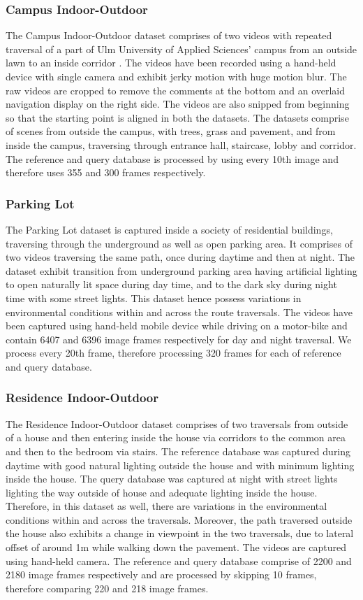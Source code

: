 \documentclass[letterpaper, 10 pt, conference]{ieeeconf}  %
\begin{document}
\subsubsection{Campus Indoor-Outdoor}
The Campus Indoor-Outdoor dataset comprises of two videos with repeated traversal of a part of Ulm University of Applied Sciences' campus from an outside lawn to an inside corridor \cite{indoorOutdoor1,indoorOutdoor2}. The videos have been recorded using a hand-held device with single camera and exhibit jerky motion with huge motion blur. The raw videos are cropped to remove the comments at the bottom and an overlaid navigation display on the right side. The videos are also snipped from beginning so that the starting point is aligned in both the datasets. The datasets comprise of scenes from outside the campus, with trees, grass and pavement, and from inside the campus, traversing through entrance hall, staircase, lobby and corridor. The reference and query database is processed by using every 10th image and therefore uses 355 and 300 frames respectively.

\subsubsection{Parking Lot}
The Parking Lot dataset is captured inside a society of residential buildings, traversing through the underground as well as open parking area. It comprises of two videos traversing the same path, once during daytime and then at night. The dataset exhibit transition from underground parking area having artificial lighting to open naturally lit space during day time, and to the dark sky during night time with some street lights. This dataset hence possess variations in environmental conditions within and across the route traversals. The videos have been captured using hand-held mobile device while driving on a motor-bike and contain 6407 and 6396 image frames respectively for day and night traversal. We process every 20th frame, therefore processing 320 frames for each of reference and query database.

\subsubsection{Residence Indoor-Outdoor}
The Residence Indoor-Outdoor dataset comprises of two traversals from outside of a house and then entering inside the house via corridors to the common area and then to the bedroom via stairs. The reference database was captured during daytime with good natural lighting outside the house and with minimum lighting inside the house. The query database was captured at night with street lights lighting the way outside of house and adequate lighting inside the house. Therefore, in this dataset as well, there are variations in the environmental conditions within and across the traversals. Moreover, the path traversed outside the house also exhibits a change in viewpoint in the two traversals, due to lateral offset of around 1m while walking down the pavement. The videos are captured using hand-held camera. The reference and query database comprise of 2200 and 2180 image frames respectively and are processed by skipping 10 frames, therefore comparing 220 and 218 image frames.
\end{document}
